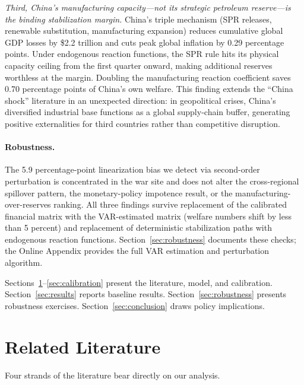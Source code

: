 \documentclass[12pt]{article}
\begin{document}
\textit{Third, China's manufacturing capacity---not its strategic petroleum reserve---is the binding stabilization margin.} China's triple mechanism (SPR releases, renewable substitution, manufacturing expansion) reduces cumulative global GDP losses by \$2.2 trillion and cuts peak global inflation by 0.29 percentage points. Under endogenous reaction functions, the SPR rule hits its physical capacity ceiling from the first quarter onward, making additional reserves worthless at the margin. Doubling the manufacturing reaction coefficient saves 0.70 percentage points of China's own welfare. This finding extends the ``China shock'' literature \citep{autor2013china} in an unexpected direction: in geopolitical crises, China's diversified industrial base functions as a global supply-chain buffer, generating positive externalities for third countries rather than competitive disruption.

\paragraph{Robustness.} The 5.9 percentage-point linearization bias we detect via second-order perturbation is concentrated in the war site and does not alter the cross-regional spillover pattern, the monetary-policy impotence result, or the manufacturing-over-reserves ranking. All three findings survive replacement of the calibrated financial matrix with the VAR-estimated matrix (welfare numbers shift by less than 5 percent) and replacement of deterministic stabilization paths with endogenous reaction functions. Section~\ref{sec:robustness} documents these checks; the Online Appendix provides the full VAR estimation and perturbation algorithm.

Sections~\ref{sec:literature}--\ref{sec:calibration} present the literature, model, and calibration. Section~\ref{sec:results} reports baseline results. Section~\ref{sec:robustness} presents robustness exercises. Section~\ref{sec:conclusion} draws policy implications.



\section{Related Literature}
\label{sec:literature}

Four strands of the literature bear directly on our analysis.
\end{document}
